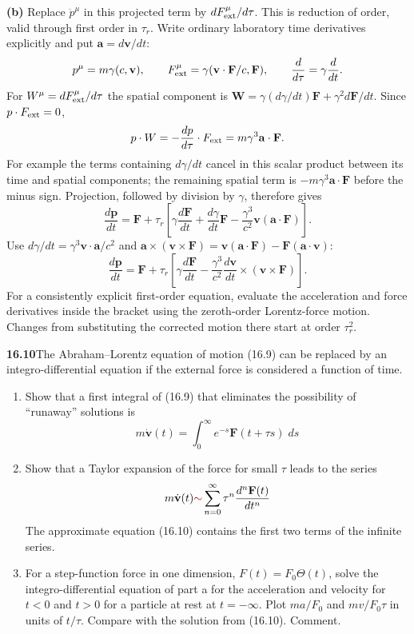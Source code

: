 \textbf{(b)} Replace $\ddot p^\mu$ in this projected term by
$dF_{\rm ext}^\mu/d\tau$. This is reduction of order, valid through
first order in $\tau_r$. Write ordinary laboratory time derivatives
explicitly and put $\mathbf a=d\mathbf v/dt$:
\[
p^\mu=m\gamma(c,\mathbf v),\qquad
F^\mu_{\rm ext}=\gamma(\mathbf v\cdot\mathbf F/c,\mathbf F),\qquad
\frac d{d\tau}=\gamma\frac d{dt}.
\]
For $W^\mu=dF^\mu_{\rm ext}/d\tau$ the spatial component is
$\mathbf W=\gamma(d\gamma/dt)\mathbf F+\gamma^2d\mathbf F/dt$.
Since $p\cdot F_{\rm ext}=0$,
\[
p\cdot W=-\frac{dp}{d\tau}\cdot F_{\rm ext}
=m\gamma^3\mathbf a\cdot\mathbf F.
\]
For example the terms containing $d\gamma/dt$ cancel in this scalar
product between its time and spatial components; the remaining spatial
term is $-m\gamma^3\mathbf a\cdot\mathbf F$ before the minus sign.
Projection, followed by division by $\gamma$, therefore gives
\[
\frac{d\mathbf p}{dt}=\mathbf F+\tau_r
\left[\gamma\frac{d\mathbf F}{dt}
+\frac{d\gamma}{dt}\mathbf F
-\frac{\gamma^3}{c^2}\mathbf v(\mathbf a\cdot\mathbf F)\right].
\]
Use $d\gamma/dt=\gamma^3\mathbf v\cdot\mathbf a/c^2$ and
$\mathbf a\times(\mathbf v\times\mathbf F)
=\mathbf v(\mathbf a\cdot\mathbf F)-\mathbf F(\mathbf a\cdot\mathbf v)$:
\[
\boxed{\frac{d\mathbf p}{dt}=\mathbf F+\tau_r
\left[\gamma\frac{d\mathbf F}{dt}
-\frac{\gamma^3}{c^2}\frac{d\mathbf v}{dt}\times
(\mathbf v\times\mathbf F)\right].}
\]
For a consistently explicit first-order equation, evaluate the
acceleration and force derivatives inside the bracket using the
zeroth-order Lorentz-force motion. Changes from substituting the
corrected motion there start at order $\tau_r^2$.

\par\bigskip
\noindent\textbf{16.10}\quad The Abraham--Lorentz equation of motion (16.9) can be replaced by an integro-differential equation if the external force is considered a function of time.
\begin{enumerate}
\item[(a)] Show that a first integral of (16.9) that eliminates the possibility of ``runaway'' solutions is
\[
m\dot{\mathbf{v}}(t)=\int_{0}^{\infty}e^{-s}\mathbf{F}(t+\tau s)\;ds
\]
\item[(b)] Show that a Taylor expansion of the force for small $\tau$ leads to the  series
\[
m\dot{\mathbf{v}}(t)\erratum{\sim}\sum_{n=0}^{\infty}\tau^{n}\frac{d^{n}\mathbf{F}(t)}{dt^{n}}
\]
The approximate equation (16.10) contains the first two terms of the infinite series.
\item[(c)] For a step-function force in one dimension, $F(t)=F_{0}\Theta(t)$, solve the integro-differential equation of part a for the acceleration and velocity for $t<0$ and $t>0$ for a particle at rest at $t=-\infty$. Plot $ma/F_{0}$ and $mv/F_{0}\tau$ in units of $t/\tau$. Compare with the solution from (16.10). Comment.
\end{enumerate}
\solution

